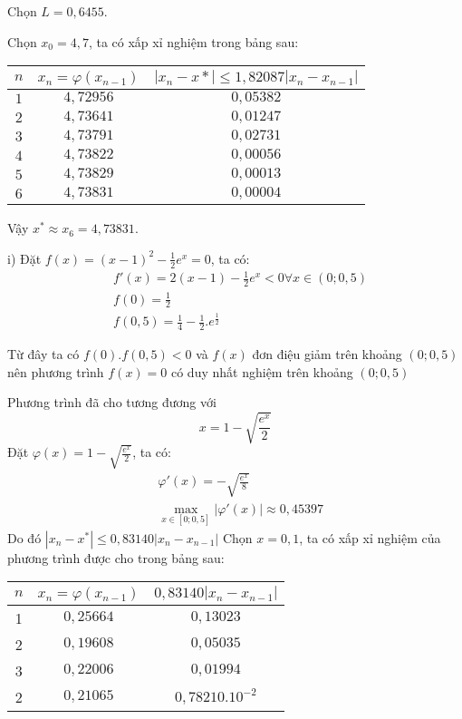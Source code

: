 Chọn $L=0,6455 $.\par
Chọn $x_0=4,7 $, ta có xấp xỉ nghiệm trong bảng sau:
\begin{longtable}{|c|c|c|}\hline
	$n$ & $x_n=\varphi\left(x_{n-1}\right) $ & $\left| x_n - x* \right| \leq 1,82087 \left|x_n - x_{n-1}\right|$\\ \hline
	\endhead
	$1$ & $4,72956$ & $0,05382$\\ \hline
	$2$ & $4,73641$ & $0,01247$ \\ \hline
	$3$ & $4,73791$ & $0,02731$ \\ \hline
	$4$ & $4,73822$ & $0,00056$ \\ \hline
	$5$ & $4,73829$ & $0,00013$ \\ \hline
	$6$ & $4,73831$ & $0,00004$ \\ \hline
\end{longtable}
Vậy $x^*\approx x_6=4,73831$.\par

i) Đặt $f(x)=(x-1)^2-\frac{1}{2}e^x=0$, ta có:
\begin{align*}
	&f'(x) =2(x-1)-\frac{1}{2}e^x<0 \forall x\in (0;0,5)\\
	&f(0)  =\frac{1}{2}\\
	&f(0,5)=\frac{1}{4}-\frac{1}{2}.e^{\frac{1}{2}}
\end{align*}

Từ đây ta có $f(0).f(0,5)<0$ và $f(x)$ đơn điệu giảm trên khoảng $(0;0,5)$ nên phương trình $f(x)=0$ có duy nhất nghiệm trên khoảng $(0;0,5)$\par

Phương trình đã cho tương đương với $$x=1-\sqrt{\frac{e^x}{2}}$$
Đặt $\varphi (x)=1-\sqrt{\frac{e^x}{2}}$, ta có:
\begin{align*}
	&\varphi'(x)=-\sqrt{\frac{e^x}{8}}\\
	&\max_{x\in [0;0,5]} |\varphi'(x)|\approx 0,45397
\end{align*}
Do đó $|x_n-x^*|\leqslant 0,83140|x_n-x_{n-1}|$
Chọn $x=0,1$, ta có xấp xỉ nghiệm của phương trình được cho trong bảng sau:

\begin{longtable}{|c|c|c|}\hline
$n$&$x_n=\varphi(x_{n-1})$&$0,83140|x_n-x_{n-1}|$\\ \hline
\endhead
1&$0,25664$&$0,13023$\\ \hline
2&$0,19608$&$0,05035$\\ \hline
3&$0,22006$&$0,01994$\\ \hline
2&$0,21065$&$0,78210.10^{-2}$\\ \hline
\end{longtable}

